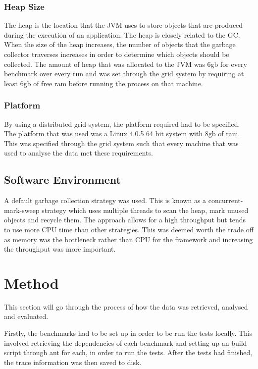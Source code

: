 \subsubsection{Heap Size}

The heap is the location that the JVM uses to store objects that are produced during the execution of an application. The heap is closely related to the GC. When the size of the heap increases, the number of objects that the garbage collector traverses increases in order to determine which objects should be collected. The amount of heap that was allocated to the JVM was 6gb for every benchmark over every run and was set through the grid system by requiring at least 6gb of free ram before running the process on that machine.

\subsubsection{Platform}

By using a distributed grid system, the platform required had to be specified. The platform that was used was a Linux 4.0.5 64 bit system with 8gb of ram. This was specified through the grid system such that every machine that was used to analyse the data met these requirements.

\subsection{Software Environment}

A default garbage collection strategy was used. This is known as a concurrent-mark-sweep strategy which uses multiple threads to scan the heap, mark unused objects and recycle them. The approach allows for a high throughput but tends to use more CPU time than other strategies. This was deemed worth the trade off as memory was the bottleneck rather than CPU for the framework and increasing the throughput was more important. 

\section{Method}

This section will go through the process of how the data was retrieved, analysed and evaluated.

Firstly, the benchmarks had to be set up in order to be run the tests locally. This involved retrieving the dependencies of each benchmark and setting up an build script through ant for each, in order to run the tests. After the tests had finished, the trace information was then saved to disk.

